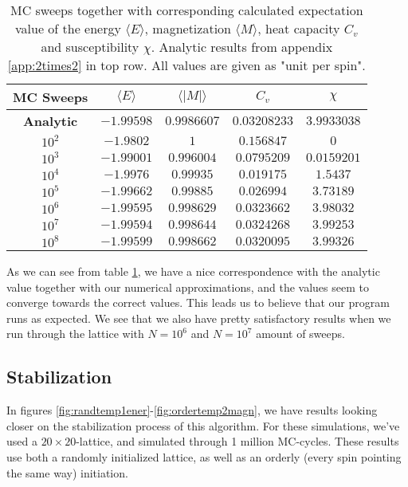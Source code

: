 \documentclass[reprint,english,notitlepage]{revtex4-1}  %
\begin{document}
\begin{table}[h!]
    \centering
    \begin{tabular}{|c|c|c|c|c|}
         \hline
         MC Sweeps & $\langle E \rangle$ & $\langle |M| \rangle$ & $C_v$ & $\chi$ \\
         \hline\hline
         \textbf{Analytic} & $-1.99598$&$0.9986607$&$0.03208233$&$3.9933038$\\
         \hline\hline
         $10^2$&$-1.9802$&$1$&$0.156847$&$0$\\
         $10^3$&$-1.99001$&$0.996004$&$0.0795209$&$0.0159201$\\
         $10^4$&$-1.9976$&$0.99935$&$0.019175$&$1.5437$\\
         $10^5$&$-1.99662$&$0.99885$&$0.026994$&$3.73189$\\
         $10^6$&$-1.99595$&$0.998629$&$0.0323662$&$3.98032$\\
         $10^7$&$-1.99594$&$0.998644$&$0.0324268$&$3.99253$\\
         $10^8$&$-1.99599$&$0.998662$&$0.0320095$&$3.99326$\\
         \hline
    \end{tabular}
    \caption{MC sweeps together with corresponding calculated expectation value of the energy $\langle E \rangle$, magnetization $\langle M \rangle$, heat capacity $C_v$ and susceptibility $\chi$. Analytic results from appendix \ref{app:2times2} in top row. All values are given as "unit per spin".}
    \label{tab:analvsnumerical}
\end{table}

As we can see from table \ref{tab:analvsnumerical}, we have a nice correspondence with the analytic value together with our numerical approximations, and the values seem to converge towards the correct values. This leads us to believe that our program runs as expected. We see that we also have pretty satisfactory results when we run through the lattice with $N = 10^6$ and $N = 10^7$ amount of sweeps.

\newpage

\subsection{Stabilization}

In figures \ref{fig:randtemp1ener}-\ref{fig:ordertemp2magn}, we have results looking closer on the stabilization process of this algorithm. For these simulations, we've used a $20\times20$-lattice, and simulated through 1 million MC-cycles. These results use both a randomly initialized lattice, as well as an orderly (every spin pointing the same way) initiation.
\end{document}
